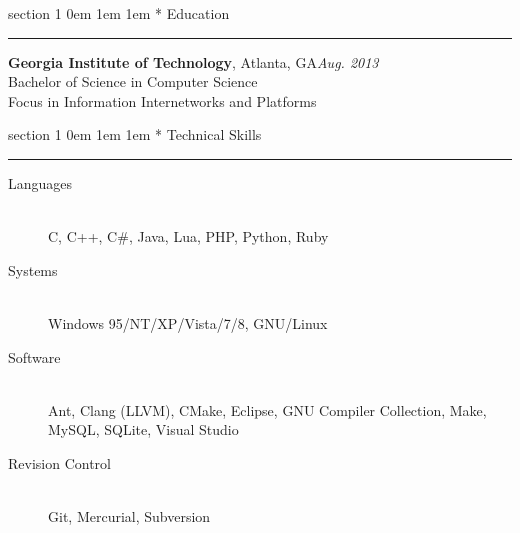 \documentclass{article}
\makeatletter
\newcommand{\name}[1]{\def \@name {#1}}
\newcommand{\streetaddress}[1]{\def \@streetaddress {#1}}
\newcommand{\citystatezip}[1]{\def \@citystatezip {#1}}
\newcommand{\phone}[1]{\def \@phone {#1}}
\newcommand{\email}[1]{\def \@email {#1}}
\newcommand{\website}[1]{\def \@website {#1}}
\renewcommand{\section}[1]{
	\vspace{0.75em}
	\@startsection
	{section}
	{1}
	{\z@}
	{0em}
	{1em \@minus 1em} %
	{\normalfont\large\sc\bfseries}
	*
	{#1}
	\vspace{-0.75em} %
	\hrule
	\par
}
\newcommand{\entry}[1]{\def \@entry {#1}}
\newcommand{\dates}[1]{\def \@dates {#1}}
\newcommand{\location}[1]{\def \@location {#1}}
\newenvironment{locationentry}{
	\vspace{0.5em}
	{\bf \@entry}, \@location \hfill {\it \@dates} \\
}{}
\makeatother
\begin{document}
\name{Robert Kernan}
\phone{(770) 355-4050}
\streetaddress{16 Arbor Way Drive}
\citystatezip{Decatur, GA 30030}
\email{rkernan@gmail.com}
\website{https://github.com/kernan}

\maketitle

\thispagestyle{empty}


\section{Education}

\entry{Georgia Institute of Technology}
\location{Atlanta, GA}
\dates{Aug. 2013}
\begin{locationentry}
	Bachelor of Science in Computer Science \\
	Focus in Information Internetworks and Platforms \\
\end{locationentry}

\section{Technical Skills}
\vspace{0.5em}
\begin{description}
	\item[Languages] \hfill \\
		C, C++, C\#, Java, Lua, PHP, Python, Ruby
	\item[Systems] \hfill \\
		Windows 95/NT/XP/Vista/7/8, GNU/Linux
	\item[Software] \hfill \\
		Ant, Clang (LLVM), CMake, Eclipse, GNU Compiler Collection, Make, MySQL,
		SQLite, Visual Studio
	\item[Revision Control] \hfill \\
		Git, Mercurial, Subversion
\end{description}
\end{document}
